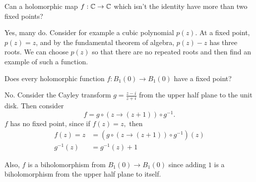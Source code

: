 \documentclass{homework}
\begin{document}
                                                                          \begin{problem}
                                                                            Can a holomorphic map $f : \mathbb{C} \to \mathbb{C}$ which isn't the identity have
                                                                              more than two fixed points?
                                                                              \end{problem}
                                                                              \begin{solution}
                                                                              Yes, many do. Consider for example a cubic polynomial $p(z).$ At a fixed point, $p(z)=z$, and by the fundamental theorem of algebra, $p(z)-z$ has three roots. We can choose $p(z)$ so that there are no repeated roots and then find an example of such a function.
                                                                              \end{solution}
                                                                              \begin{problem}
                                                                                Does every holomorphic function $f : B_1(0) \to B_1(0)$ have a fixed point?
                                                                                \end{problem}
                                                                                \begin{solution}
                                                                                No. Consider the Cayley transform $g=\frac{z-i}{z+i}$ from the upper half plane to the unit disk. Then consider
                                                                                \[
                                                                                f = g\circ \left(z\to(z + 1)\right) \circ g^{-1}.
                                                                                \]
                                                                                $f$ has no fixed point, since if $f(z)=z,$ then 
                                                                                \begin{align*}
                                                                                f(z) = z &= (g\circ \left(z\to(z + 1)\right) \circ g^{-1})(z)\\
                                                                                g^{-1}(z) &= g^{-1}(z) + 1
                                                                                \end{align*}

                                                                                Also, $f$ is a biholomorphism from $B_1(0)\to B_1(0)$ since adding $1$ is a biholomorphism from the upper half plane to itself.
                                                                                \end{solution}
\end{document}
